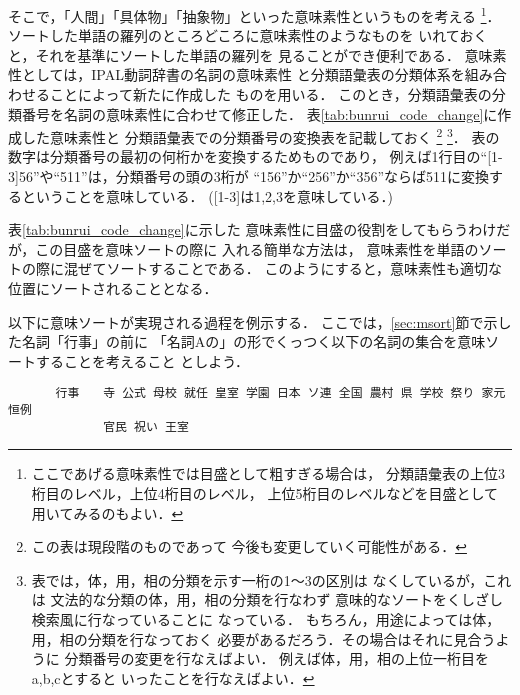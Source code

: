 そこで，「人間」「具体物」「抽象物」といった意味素性というものを考える
\footnote{
ここであげる意味素性では目盛として粗すぎる場合は，
分類語彙表の上位3桁目のレベル，上位4桁目のレベル，
上位5桁目のレベルなどを目盛として用いてみるのもよい．}．
ソートした単語の羅列のところどころに意味素性のようなものを
いれておくと，それを基準にソートした単語の羅列を
見ることができ便利である．
意味素性としては，IPAL動詞辞書\cite{IPAL}の名詞の意味素性
と分類語彙表の分類体系を組み合わせることによって新たに作成した
ものを用いる．
このとき，分類語彙表の分類番号を名詞の意味素性に合わせて修正した．
表\ref{tab:bunrui_code_change}に作成した意味素性と
分類語彙表での分類番号の変換表を記載しておく
\footnote{
この表は現段階のものであって
今後も変更していく可能性がある．}
\footnote{
表では，体，用，相の分類を示す一桁の1〜3の区別は
なくしているが，これは
文法的な分類の体，用，相の分類を行なわず
意味的なソートをくしざし検索風に行なっていることに
なっている．
もちろん，用途によっては体，用，相の分類を行なっておく
必要があるだろう．その場合はそれに見合うように
分類番号の変更を行なえばよい．
例えば体，用，相の上位一桁目をa,b,cとすると
いったことを行なえばよい．}．
表の数字は分類番号の最初の何桁かを変換するためものであり，
例えば1行目の``[1-3]56''や``511''は，分類番号の頭の3桁が
``156''か``256''か``356''ならば511に変換するということを意味している．
([1-3]は1,2,3を意味している．)

表\ref{tab:bunrui_code_change}に示した
意味素性に目盛の役割をしてもらうわけだが，この目盛を意味ソートの際に
入れる簡単な方法は，
意味素性を単語のソートの際に混ぜてソートすることである．
このようにすると，意味素性も適切な位置にソートされることとなる．

以下に意味ソートが実現される過程を例示する．
ここでは，\ref{sec:msort}節で示した名詞「行事」の前に
「名詞Aの」の形でくっつく以下の名詞の集合を意味ソートすることを考えること
としよう．

{\small
\begin{verbatim}
　　　　行事　　寺 公式 母校 就任 皇室 学園 日本 ソ連 全国 農村 県 学校 祭り 家元 恒例 
　　　　　　　　官民 祝い 王室
\end{verbatim}
}

